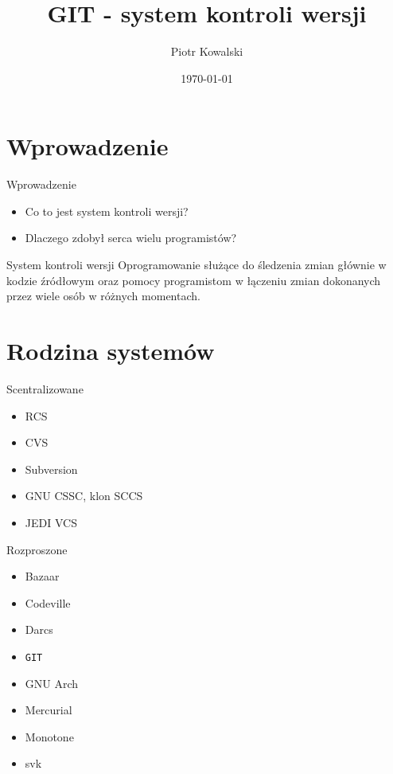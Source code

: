 \documentclass{beamer}
\title[GIT]{GIT - system kontroli wersji}
\author{Piotr Kowalski}
\institute{Wyższa Szkoła Informatyki Stosowanej i Zarządzania}
\date{\today}
\begin{document}

\begin{frame}
  \titlepage
\end{frame}


\section{Wprowadzenie}

\begin{frame}{Wprowadzenie}
\begin{itemize}
  \item Co to jest system kontroli wersji?
  \item Dlaczego zdobył serca wielu programistów?
\end{itemize}
\vskip 1cm
\begin{block}{System kontroli wersji}
Oprogramowanie służące do śledzenia zmian głównie w kodzie źródłowym oraz pomocy programistom w łączeniu zmian dokonanych przez wiele osób w różnych momentach.
\end{block}
\end{frame}


\section{Rodzina systemów}

\begin{frame}{Scentralizowane}
\begin{itemize}
  \item RCS
  \item CVS
  \item Subversion
  \item GNU CSSC, klon SCCS
  \item JEDI VCS
\end{itemize}
\end{frame}

\begin{frame}{Rozproszone}
\begin{itemize}
  \item Bazaar
  \item Codeville
  \item Darcs
  \item \texttt{GIT}
  \item GNU Arch
  \item Mercurial
  \item Monotone
  \item svk
\end{itemize}
\end{frame}
\end{document}
